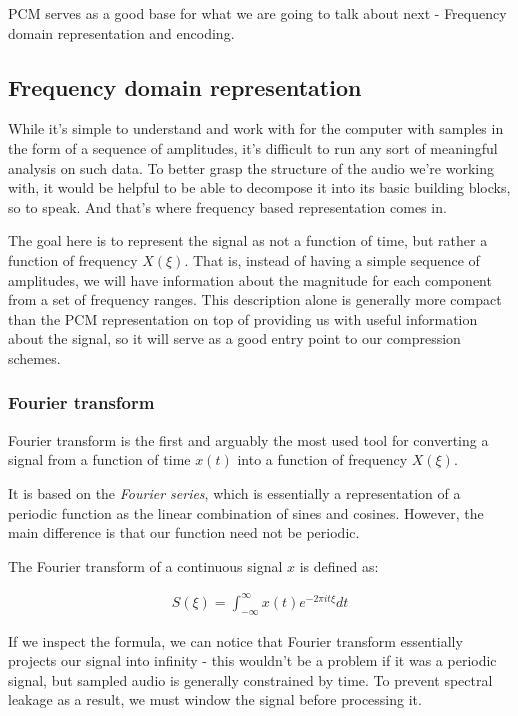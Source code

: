 PCM serves as a good base for what we are going to talk about next - Frequency domain representation and encoding.

\subsection{Frequency domain representation}
While it's simple to understand and work with for the computer with samples in the form of a sequence of amplitudes, it's difficult to run any sort of meaningful analysis on such data. To better grasp the structure of the audio we're working with, it would be helpful to be able to decompose it into its basic building blocks, so to speak. And that's where frequency based representation comes in.

The goal here is to represent the signal as not a function of time, but rather a function of frequency $X(\xi)$. That is, instead of having a simple sequence of amplitudes, we will have information about the magnitude for each component from a set of frequency ranges. This description alone is generally more compact than the PCM representation \cite{bosi_goldberg_2003} on top of providing us with useful information about the signal, so it will serve as a good entry point to our compression schemes.

\subsubsection{Fourier transform}
Fourier transform is the first and arguably the most used tool for converting a signal from a function of time $x(t)$ into a function of frequency $X(\xi)$.

It is based on the \emph{Fourier series}, which is essentially a representation of a periodic function as the linear combination of sines and cosines. \cite{Shatkay:1995:FTP:864947} However, the main difference is that our function need not be periodic.

The Fourier transform of a continuous signal $x$ is defined as: \cite{recoskie_mann_2014}

\begin{align}
S(\xi) = \int_{-\infty}^{\infty}x(t)e^{-2\pi it\xi}dt
\end{align}

If we inspect the formula, we can notice that Fourier transform essentially projects our signal into infinity - this wouldn't be a problem if it was a periodic signal, but sampled audio is generally constrained by time. To prevent spectral leakage as a result, we must window the signal before processing it. \cite{heinzel_2002_windows}

